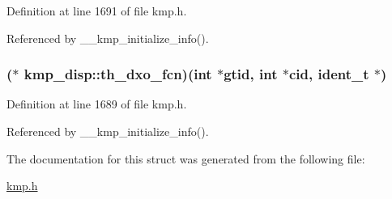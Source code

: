 Definition at line 1691 of file kmp.\-h.



Referenced by \-\_\-\-\_\-kmp\-\_\-initialize\-\_\-info().

\hypertarget{structkmp__disp_a661b8f748ff2f3204218ae2d7ece3287}{
\subsubsection[{th\-\_\-dxo\-\_\-fcn}]{($\ast$ kmp\-\_\-disp\-::th\-\_\-dxo\-\_\-fcn)({\bf int} $\ast$gtid, {\bf int} $\ast$cid, {\bf ident\-\_\-t} $\ast$)}}\label{structkmp__disp_a661b8f748ff2f3204218ae2d7ece3287}


Definition at line 1689 of file kmp.\-h.



Referenced by \-\_\-\-\_\-kmp\-\_\-initialize\-\_\-info().



The documentation for this struct was generated from the following file\-:\begin{DoxyCompactItemize}
\item 
\hyperlink{kmp_8h}{kmp.\-h}\end{DoxyCompactItemize}
